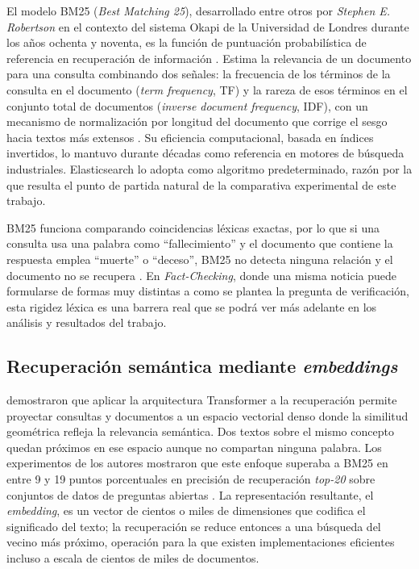 El modelo BM25 (\textit{Best Matching 25}), desarrollado entre otros por \textit{Stephen E. Robertson} en el contexto del sistema Okapi de la Universidad de Londres durante los años ochenta y noventa, es la función de puntuación probabilística de referencia en recuperación de información \cite{robertson2009bm25}. Estima la relevancia de un documento para una consulta combinando dos señales: la frecuencia de los términos de la consulta en el documento (\textit{term frequency}, TF) y la rareza de esos términos en el conjunto total de documentos (\textit{inverse document frequency}, IDF), con un mecanismo de normalización por longitud del documento que corrige el sesgo hacia textos más extensos \cite{robertson2009bm25}. Su eficiencia computacional, basada en índices invertidos, lo mantuvo durante décadas como  referencia en motores de búsqueda industriales. Elasticsearch lo adopta como algoritmo  predeterminado, razón por la que resulta el punto de partida natural de la comparativa  experimental de este trabajo.

BM25 funciona comparando coincidencias léxicas exactas, por lo que si una consulta usa una palabra como ``fallecimiento'' y el documento que contiene la respuesta emplea ``muerte'' o ``deceso'', BM25 no detecta ninguna relación y el documento no se recupera \cite{karpukhin2020dpr}. En \textit{Fact-Checking}, donde una misma noticia puede formularse de formas muy distintas a como se plantea la pregunta de verificación, esta rigidez léxica es una barrera real que se podrá ver más adelante en los análisis y resultados del trabajo.

\subsection{Recuperación semántica mediante \textit{embeddings}}

\citet{karpukhin2020dpr} demostraron que aplicar la arquitectura Transformer a la recuperación permite proyectar consultas y documentos a un espacio vectorial denso donde la similitud geométrica refleja la relevancia semántica. Dos textos sobre el mismo concepto quedan próximos en ese espacio aunque no compartan ninguna palabra. Los experimentos de los autores mostraron que este enfoque superaba a BM25 en entre 9 y 19 puntos porcentuales en precisión de recuperación \textit{top-20} sobre conjuntos de datos de preguntas abiertas \cite{karpukhin2020dpr}. La representación resultante, el \textit{embedding}, es un vector de cientos o miles de dimensiones que codifica el significado del texto; la recuperación se reduce entonces a una búsqueda del vecino más próximo, operación para la que existen implementaciones eficientes incluso a escala de cientos de miles de documentos.

